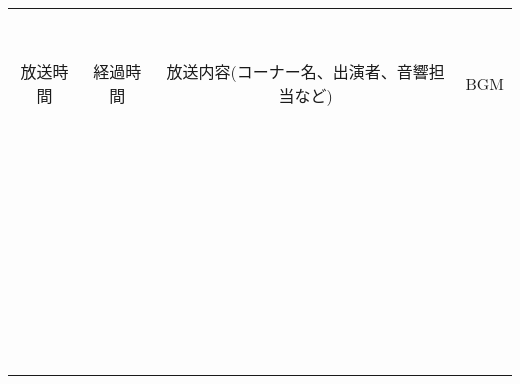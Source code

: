 \documentclass{jsarticle}
\begin{document}
\begin{center}
\begin{longtable}[h]{|c|c|c|c|}
    &&&\\
    &&&\\
    &&&\\
    &&&\\
    &&&\\
    &&&\\
    &&&\\
    &&&\\ \hline
    放送時間&経過時間&\hspace*{20truemm}放送内容(コーナー名、出演者、音響担当など)\hspace*{20truemm}&BGM\\ \hline
    &&&\\
    &&&\\
    &&&\\
    &&&\\
    &&&\\
    &&&\\
    &&&\\
    &&&\\
    &&&\\
    &&&\\
    &&&\\
    &&&\\
    &&&\\
    &&&\\
    &&&\\
    &&&\\
    &&&\\
    &&&\\
    &&&\\
    &&&\\
    &&&\\
    &&&\\
    &&&\\
    &&&\\
    &&&\\
    &&&\\
    &&&\\
    &&&\\
    &&&\\
    &&&\\
    &&&\\
    &&&\\
    &&&\\
    &&&\\
    &&&\\
    &&&\\
    &&&\\
    &&&\\
    &&&\\
    &&&\\
    &&&\\
    &&&\\
    &&&\\
    &&&\\ \hline
  \end{longtable}
  \end{center}
\end{document}
